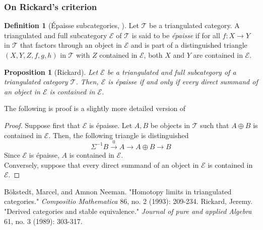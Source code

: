 \documentclass[oneside,11pt]{amsart}
\newtheorem{prop}[thm]{Proposition}
\theoremstyle{definition}
\newtheorem{defn}[thm]{Definition}
\theoremstyle{remark}
\begin{document}
\subsubsection*{On Rickard's criterion}
\begin{defn}[\'{E}paisse subcategories, \cite{SGA}]
  Let $\mathscr{T} $ be a triangulated category.  A triangulated and full subcategory $\mathscr{E} $ of $\mathscr{T} $ is said to be \emph{\'{e}paisse} if for all $f:X \rightarrow Y$ in $\mathscr{T}$ that factors through an object in $\mathscr{E} $ and is part of a distinguished triangle $(X,Y,Z,f,g,h)$ in $\mathscr{T} $ with $Z$ contained in $\mathscr{E} $, both $X$ and $Y$ are contained in $\mathscr{E} $.         
\end{defn}
\begin{prop}[Rickard]
 Let $\mathscr{E} $ be a triangulated and full subcategory of a triangulated category $\mathscr{T} $. Then, $\mathscr{E} $ is \'{e}paisse if and only if every direct summand of an object in $\mathscr{E} $ is contained in $\mathscr{E} $.  
\end{prop}
The following is proof is a slightly more detailed version of \cite[Criterion 1.3]{Nee} 
\begin{proof}
 Suppose first that $\mathscr{E} $ is \'{e}paisse. Let $A,B$ be objects in $\mathscr{T} $ such that $A\oplus B$ is contained in $\mathscr{E} $. Then, the following triangle is distinguished
\begin{equation*}
 \Sigma^{-1}B \overset{0}{\longrightarrow} A \longrightarrow A \oplus B \longrightarrow B
\end{equation*}
Since $\mathscr{E} $ is \'{e}paisse, $A$ is contained in $\mathscr{E} $.\\
Conversely, suppose that every direct summand of an object in $\mathscr{E} $ is contained in $\mathscr{E} $.     
\end{proof}



\newpage
\begin{thebibliography}{Neil1234}
 Bökstedt, Marcel, and Amnon Neeman. "Homotopy limits in triangulated categories." \emph{Compositio Mathematica} 86, no. 2 (1993): 209-234.
 Rickard, Jeremy. "Derived categories and stable equivalence." \emph{Journal of pure and applied Algebra} 61, no. 3 (1989): 303-317.
	
\end{thebibliography}
\end{document}
